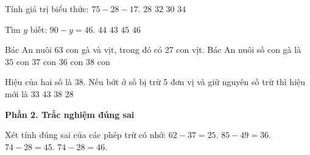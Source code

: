 \begin{ex} %
Tính giá trị biểu thức: $75 - 28 - 17$.
\choice
{$28$}
{$32$}
{\True $30$}
{$34$}
\end{ex}

\begin{ex} %
Tìm $y$ biết: $90 - y = 46$.
\choice
{\True $44$}
{$43$}
{$45$}
{$46$}
\end{ex}

\begin{ex} %
Bác An nuôi 63 con gà và vịt, trong đó có 27 con vịt. Bác An nuôi số con gà là
\choice
{$35$ con}
{$37$ con}
{\True $36$ con}
{$38$ con}
\end{ex}

\begin{ex} %
Hiệu của hai số là 38. Nếu bớt ở số bị trừ 5 đơn vị và giữ nguyên số trừ thì hiệu mới là
\choice
{\True $33$}
{$43$}
{$38$}
{$28$}
\end{ex}

\textbf{Phần 2. Trắc nghiệm đúng sai}

\begin{ex} %
Xét tính đúng sai của các phép trừ có nhớ:
\choiceTF
{\True $62 - 37 = 25$.}
{\True $85 - 49 = 36$.}
{$74 - 28 = 45$.}
{\True $74 - 28 = 46$.}
\end{ex}

